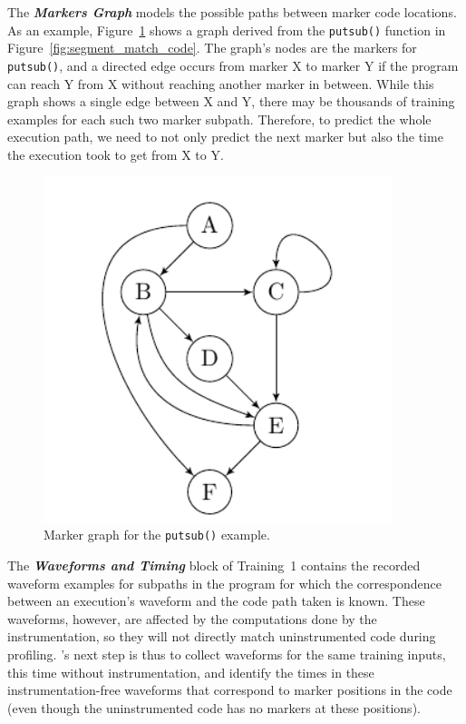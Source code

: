The \textbf{\textit{Markers Graph}} models the possible paths between marker code locations. As an example, Figure~\ref{fig:mark_graph} shows a graph derived from the \texttt{putsub()} function in Figure~\ref{fig:segment_match_code}. The graph's nodes are the markers for \texttt{putsub()}, and a directed edge occurs from marker X to marker Y if the program can reach Y from X without reaching another marker in between. While this graph shows a single edge between X and Y, there may be thousands of training examples for each such two marker subpath. Therefore, to predict the whole execution path, we need to not only predict the next marker but also the time the execution took to get from X to Y.

\begin{figure}[tbh]
\centering
\includegraphics[width=4in]{../issta_profile/profiling/figures/mark_graph}
\caption{Marker graph for the \texttt{putsub()} example.}
\label{fig:mark_graph}
\end{figure}


The \textbf{\textit{Waveforms and Timing}} block of Training~1 contains the recorded waveform examples for subpaths in the program for which the correspondence between an execution's waveform and the code path taken is known. These waveforms, however, are affected by the computations done by the instrumentation, so they will not directly match uninstrumented code during profiling. \zop's next step is thus to collect waveforms for the same training inputs, this time without instrumentation, and identify the times in these instrumentation-free waveforms that correspond to marker positions in the code (even though the uninstrumented code has no markers at these positions).

